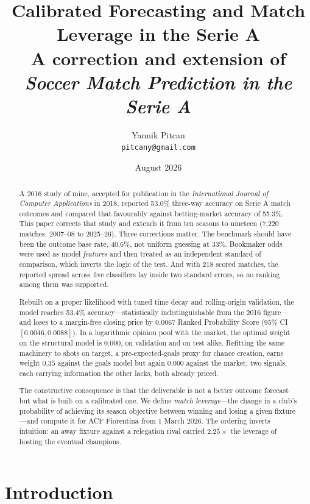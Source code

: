 \documentclass[11pt]{article}
\title{\bfseries Calibrated Forecasting and Match Leverage in the Serie A\\[2pt]
\large A correction and extension of \emph{Soccer Match Prediction in the Serie A}}
\author{Yannik Pitcan\\
\small \texttt{pitcany@gmail.com}}
\date{August 2026}
\begin{document}
\maketitle

\begin{abstract}
\noindent
A 2016 study of mine, accepted for publication in the \emph{International Journal
of Computer Applications} in 2018, reported 53.0\% three-way accuracy on Serie A
match outcomes and compared that favourably against betting-market accuracy of
55.3\%. This paper corrects that study and extends it from ten seasons to
nineteen (7{,}220 matches, 2007--08 to 2025--26). Three corrections matter. The
benchmark should have been the outcome base rate, 40.6\%, not uniform guessing
at 33\%. Bookmaker odds were used as model \emph{features} and then treated as
an independent standard of comparison, which inverts the logic of the test. And
with 218 scored matches, the reported spread across five classifiers lay inside
two standard errors, so no ranking among them was supported.

Rebuilt on a proper likelihood with tuned time decay and rolling-origin
validation, the model reaches 53.4\% accuracy---statistically indistinguishable
from the 2016 figure---and loses to a margin-free closing price by $0.0067$
Ranked Probability Score ($95\%$ CI $[0.0046, 0.0088]$). In a logarithmic
opinion pool with the market, the optimal weight on the structural model is
$0.000$, on validation and on test alike. Refitting the same machinery to shots
on target, a pre-expected-goals proxy for chance creation, earns weight $0.35$
against the goals model but again $0.000$ against the market: two signals, each
carrying information the other lacks, both already priced.

The constructive consequence is that the deliverable is not a better outcome
forecast but what is built on a calibrated one. We define \emph{match
leverage}---the change in a club's probability of achieving its season objective
between winning and losing a given fixture---and compute it for ACF Fiorentina
from 1 March 2026. The ordering inverts intuition: an away fixture against a
relegation rival carried $2.25\times$ the leverage of hosting the eventual
champions.
\end{abstract}

\section{Introduction}
\end{document}
